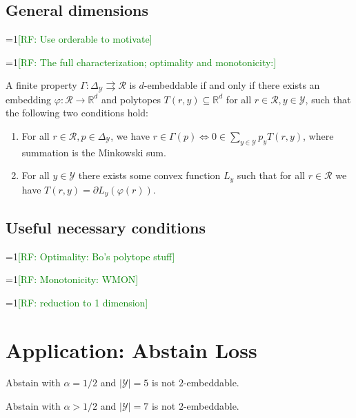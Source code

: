 \documentclass[11pt]{colt2019}
\newcommand{\Comments}{1}
\newcommand{\mynote}[2]{\ifnum\Comments=1\textcolor{#1}{#2}\fi}
\newcommand{\raf}[1]{\mynote{green}{[RF: #1]}}
\newcommand{\reals}{\mathbb{R}}
\newcommand{\simplex}{\Delta_\Y}
\newcommand{\R}{\mathcal{R}}
\newcommand{\Y}{\mathcal{Y}}
\newcommand{\toto}{\rightrightarrows}
\begin{document}
\subsection{General dimensions}

\raf{Use orderable to motivate}

\raf{The full characterization; optimality and monotonicity:}
\begin{theorem}
  A finite property $\Gamma:\simplex\toto\R$ is $d$-embeddable if and only if there exists an embedding $\varphi: \R \to \reals^d$ and polytopes $T(r,y) \subseteq \reals^d$ for all $r\in\R, y\in\Y$, such that the following two conditions hold:
  \begin{enumerate}
  \item For all $r\in\R, p\in\simplex$, we have $r\in \Gamma(p) \iff 0 \in \sum_{y\in\Y} p_y T(r,y)$, where summation is the Minkowski sum.
  \item For all $y\in\Y$ there exists some convex function $L_y$ such that for all $r\in\R$ we have $T(r,y) = \partial L_y(\varphi(r))$.
  \end{enumerate}
\end{theorem}

\subsection{Useful necessary conditions}

\begin{corollary}
  \raf{Optimality: Bo's polytope stuff}
\end{corollary}

\begin{corollary}
  \raf{Monotonicity: WMON}
\end{corollary}

\begin{corollary}
  \raf{reduction to 1 dimension}
\end{corollary}

\section{Application: Abstain Loss}

\begin{theorem}
  Abstain with $\alpha=1/2$ and $|\Y|=5$ is not $2$-embeddable.
\end{theorem}

\begin{theorem}
  Abstain with $\alpha > 1/2$ and $|\Y|=7$ is not $2$-embeddable.
\end{theorem}
\end{document}
